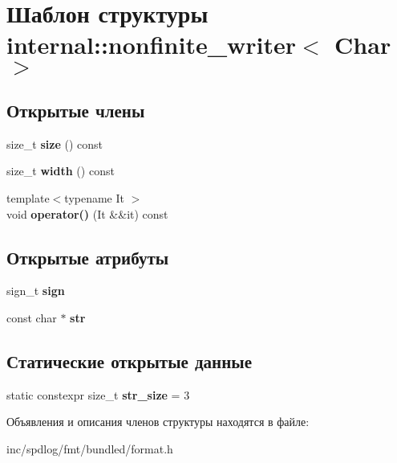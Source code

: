 \hypertarget{structinternal_1_1nonfinite__writer}{}\section{Шаблон структуры internal\+:\+:nonfinite\+\_\+writer$<$ Char $>$}
\label{structinternal_1_1nonfinite__writer}
\subsection*{Открытые члены}
\begin{DoxyCompactItemize}
\item 
\mbox{\label{structinternal_1_1nonfinite__writer_a1b45e802534f50347703e8f44757dc68}} 
size\+\_\+t {\bfseries size} () const
\item 
\mbox{\label{structinternal_1_1nonfinite__writer_aed828e8385f10eae1aaf2498fc1558c1}} 
size\+\_\+t {\bfseries width} () const
\item 
\mbox{\label{structinternal_1_1nonfinite__writer_ac6157bccf20a48b5aa253e40bf65f651}} 
{\footnotesize template$<$typename It $>$ }\\void {\bfseries operator()} (It \&\&it) const
\end{DoxyCompactItemize}
\subsection*{Открытые атрибуты}
\begin{DoxyCompactItemize}
\item 
\mbox{\label{structinternal_1_1nonfinite__writer_ae7fd0c789fd7d100d53b5dc0faa4d630}} 
sign\+\_\+t {\bfseries sign}
\item 
\mbox{\label{structinternal_1_1nonfinite__writer_a25e33e2b960659e46acbcd8079b64692}} 
const char $\ast$ {\bfseries str}
\end{DoxyCompactItemize}
\subsection*{Статические открытые данные}
\begin{DoxyCompactItemize}
\item 
\mbox{\label{structinternal_1_1nonfinite__writer_a34273db3ce0a0f4c639cd976a61f9fae}} 
static constexpr size\+\_\+t {\bfseries str\+\_\+size} = 3
\end{DoxyCompactItemize}


Объявления и описания членов структуры находятся в файле\+:\begin{DoxyCompactItemize}
\item 
inc/spdlog/fmt/bundled/format.\+h\end{DoxyCompactItemize}
